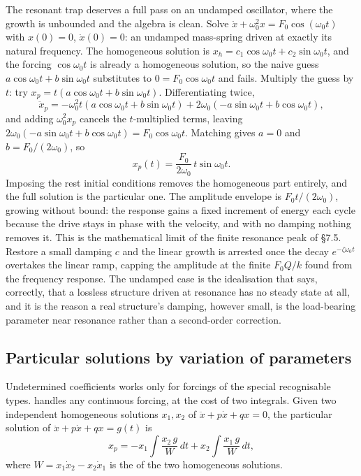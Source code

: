 The resonant trap deserves a full pass on an undamped oscillator, where
the growth is unbounded and the algebra is clean. Solve $\ddot{x} +
\omega_{0}^{2} x = F_{0}\cos(\omega_{0} t)$ with $x(0) = 0$,
$\dot{x}(0) = 0$: an undamped mass-spring driven at exactly its natural
frequency. The homogeneous solution is $x_{h} = c_{1}\cos\omega_{0} t +
c_{2}\sin\omega_{0} t$, and the forcing $\cos\omega_{0} t$ is already a
homogeneous solution, so the naive guess $a\cos\omega_{0} t +
b\sin\omega_{0} t$ substitutes to $0 = F_{0}\cos\omega_{0} t$ and fails.
Multiply the guess by $t$: try $x_{p} = t(a\cos\omega_{0} t +
b\sin\omega_{0} t)$. Differentiating twice,
\[
\ddot{x}_{p} = -\omega_{0}^{2} t(a\cos\omega_{0} t + b\sin\omega_{0} t)
+ 2\omega_{0}(-a\sin\omega_{0} t + b\cos\omega_{0} t),
\]
and adding $\omega_{0}^{2} x_{p}$ cancels the $t$-multiplied terms,
leaving $2\omega_{0}(-a\sin\omega_{0} t + b\cos\omega_{0} t) =
F_{0}\cos\omega_{0} t$. Matching gives $a = 0$ and $b = F_{0}/(2
\omega_{0})$, so
\[
x_{p}(t) = \frac{F_{0}}{2\omega_{0}}\, t\sin\omega_{0} t.
\]
Imposing the rest initial conditions removes the homogeneous part
entirely, and the full solution is the particular one. The amplitude
envelope is $F_{0} t/(2\omega_{0})$, growing without bound: the response
gains a fixed increment of energy each cycle because the drive stays in
phase with the velocity, and with no damping nothing removes it. This is
the mathematical limit of the finite resonance peak of \S7.5. Restore a
small damping $c$ and the linear growth is arrested once the decay
$e^{-\zeta\omega_{0} t}$ overtakes the linear ramp, capping the
amplitude at the finite $F_{0} Q/k$ found from the frequency response.
The undamped case is the idealisation that says, correctly, that a
lossless structure driven at resonance has no steady state at all, and
it is the reason a real structure's damping, however small, is the
load-bearing parameter near resonance rather than a second-order
correction.

\subsection{Particular solutions by variation of parameters}

Undetermined coefficients works only for forcings of the special
recognisable types.  handles any
continuous forcing, at the cost of two integrals. Given two
independent homogeneous solutions $x_{1}, x_{2}$ of $\ddot{x} +
p\dot{x} + qx = 0$, the particular solution of $\ddot{x} + p\dot{x}
+ qx = g(t)$ is
\[
x_{p} = -x_{1} \int \frac{x_{2}\, g}{W}\,dt + x_{2} \int
\frac{x_{1}\, g}{W}\,dt,
\]
where $W = x_{1} \dot{x}_{2} - x_{2} \dot{x}_{1}$ is the
 of the two homogeneous solutions.

